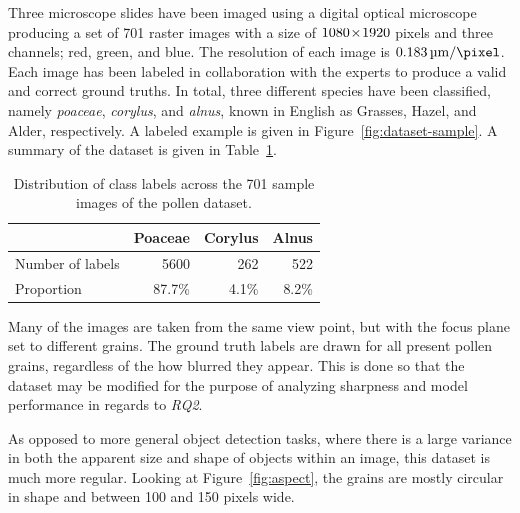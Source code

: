 Three microscope slides have been imaged using a digital optical microscope producing a set of 701 raster images with a size of \(1080\!\times \! 1920\) pixels and three channels; red, green, and blue.
The resolution of each image is \(\SI{0.183}{\micro\metre\per\pixel}\).
Each image has been labeled in collaboration with the experts to produce a valid and correct ground truths.
In total, three different species have been classified, namely \textit{poaceae}, \textit{corylus}, and \textit{alnus}, known in English as Grasses, Hazel, and Alder, respectively.
A labeled example is given in Figure~\ref{fig:dataset-sample}.
A summary of the dataset is given in Table~\ref{tab:dataset}.

\begin{table}[htbp]
  \caption[Class distribution across the dataset]{Distribution of class labels across the 701 sample images of the pollen dataset.}\label{tab:dataset}
  \centering
  \begin{tabular}{lrrr} \toprule
                      & Poaceae & Corylus & Alnus \\ \midrule
    Number of labels  & 5600    & 262     & 522 \\
    Proportion        & 87.7\%  & 4.1\%   & 8.2\% \\ \bottomrule
  \end{tabular}
\end{table}

Many of the images are taken from the same view point, but with the focus plane set to different grains.
The ground truth labels are drawn for all present pollen grains, regardless of the how blurred they appear.
This is done so that the dataset may be modified for the purpose of analyzing sharpness and model performance in regards to \textit{RQ2}.

As opposed to more general object detection tasks, where there is a large variance in both the apparent size and shape of objects within an image, this dataset is much more regular.
Looking at Figure~\ref{fig:aspect}, the grains are mostly circular in shape and between 100 and 150 pixels wide.

